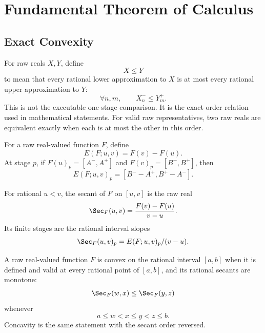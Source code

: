 \chapter{Fundamental Theorem of Calculus}

\section{Exact Convexity}

\begin{definition}\label{def:raw-real-order}
\leanok
For raw reals \(X,Y\), define
\[
  X\le Y
\]
to mean that every rational lower approximation to \(X\) is at most every
rational upper approximation to \(Y\):
\[
  \forall n,m,\qquad X_n^- \le Y_m^+.
\]
This is not the executable one-stage comparison.  It is the exact order
relation used in mathematical statements.  For valid raw representatives,
two raw reals are equivalent exactly when each is at most the other in this
order.
\end{definition}

\begin{definition}\label{def:endpoint-diff}
For a raw real-valued function \(F\), define
\[
  E(F;u,v)=F(v)-F(u).
\]
At stage \(p\), if \(F(u)_p=[A^-,A^+]\) and
\(F(v)_p=[B^-,B^+]\), then
\[
  E(F;u,v)_p=[B^- - A^+,B^+ - A^-].
\]
\end{definition}

\begin{definition}\label{def:rational-secant}
\leanok
For rational \(u<v\), the secant of \(F\) on \([u,v]\) is the raw real
\[
  \Sec_F(u,v)=\frac{F(v)-F(u)}{v-u}.
\]
Its finite stages are the rational interval slopes
\[
  \Sec_F(u,v)_p=E(F;u,v)_p/(v-u).
\]
\end{definition}

\begin{definition}\label{def:exact-convexity}
\leanok
A raw real-valued function \(F\) is convex on the rational interval
\([a,b]\) when it is defined and valid at every rational point of
\([a,b]\), and its rational secants are monotone:
\[
  \Sec_F(w,x)\le \Sec_F(y,z)
\]
whenever
\[
  a\le w<x\le y<z\le b.
\]
Concavity is the same statement with the secant order reversed.
\end{definition}

